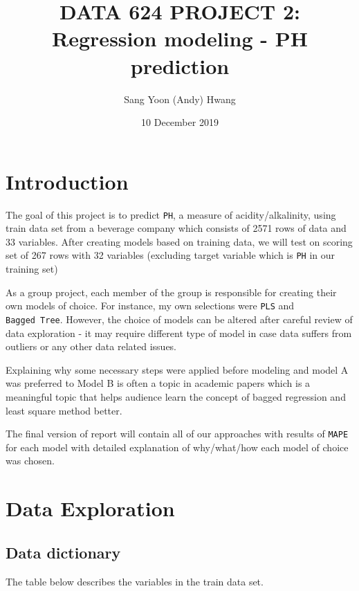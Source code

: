 \documentclass[]{report}
\title{DATA 624 PROJECT 2: Regression modeling - PH prediction}
\author{Sang Yoon (Andy) Hwang}
\date{10 December 2019}
\begin{document}
\maketitle

{
\setcounter{tocdepth}{1}
\tableofcontents
}
\thispagestyle{empty} \newpage
\clearpage
{}

\chapter*{Introduction}\label{intro}

The goal of this project is to predict \texttt{PH}, a measure of
acidity/alkalinity, using train data set from a beverage company which
consists of 2571 rows of data and 33 variables. After creating models
based on training data, we will test on scoring set of 267 rows with 32
variables (excluding target variable which is \texttt{PH} in our
training set)

As a group project, each member of the group is responsible for creating
their own models of choice. For instance, my own selections were
\texttt{PLS} and \texttt{Bagged\ Tree}. However, the choice of models
can be altered after careful review of data exploration - it may require
different type of model in case data suffers from outliers or any other
data related issues.

Explaining why some necessary steps were applied before modeling and
model A was preferred to Model B is often a topic in academic papers
which is a meaningful topic that helps audience learn the concept of
bagged regression and least square method better.

The final version of report will contain all of our approaches with
results of \texttt{MAPE} for each model with detailed explanation of
why/what/how each model of choice was chosen.

\chapter{Data Exploration}\label{data-exploration}

\section{Data dictionary}\label{data-dictionary}

The table below describes the variables in the train data set.
\end{document}
